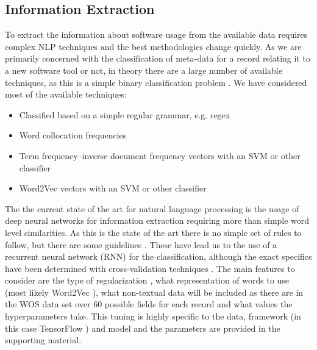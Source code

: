 \documentclass[12pt, a4paper]{article}
\begin{document}
\subsection{Information Extraction}

To extract the information about software usage from the available data requires complex NLP techniques and the best methodologies change quickly\citep{evans2016machine}. As we are primarily concerned with the classification of meta-data for a record relating it to a new software tool or not, in theory there are a large number of available techniques, as this is a simple binary classification problem \citep{james2013introduction}\citep{jurafsky2000speech}\citep{murphy2012machine}. We have considered most of the available techniques:

\begin{itemize}
\item Classified based on a simple regular grammar, e.g. regex
\item Word collocation frequencies \citep{manning1999foundations}
\item Term frequency–inverse document frequency vectors with an SVM or other classifier \citep{collobert2011natural}
\item Word2Vec vectors with an SVM or other classifier\citep{mikolov2013distributed}\citep{collobert2011natural}
\end{itemize}

The the current state of the art for natural language processing is the usage of deep neural networks for information extraction requiring more than simple word level similarities\citep{manning-EtAl}. As this is the state of the art there is no simple set of rules to follow, but there are some guidelines \citep{Goodfellow-et-al-2016}. These have lead us to the use of a recurrent neural network (RNN) \citep{mikolov2010recurrent} for the classification, although the exact specifics have been determined with cross-validation techniques \citep{james2013introduction}. The main features to consider are the type of regularization \citep{Goodfellow-et-al-2016}, what representation of words to use (most likely Word2Vec \citep{mikolov2013distributed}), what non-textual data will be included as there are in the WOS data set over 60 possible fields for each record \citep{mkdocs} and what values the hyperparameters take\citep{Goodfellow-et-al-2016}. This tuning is highly specific to the data, framework (in this case TensorFlow \citep{abadi2016tensorflow}) and model and the parameters are provided in the supporting material.
\end{document}
